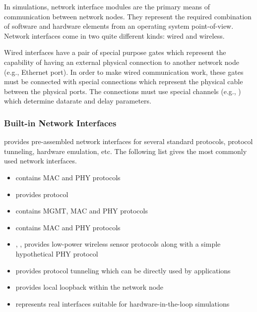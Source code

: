 

In \inet simulations, network interface modules are the primary means of communication between network nodes. They represent the required combination of software and hardware elements from an operating system point-of-view. Network interfaces come in two quite different kinds: wired and wireless.

Wired interfaces have a pair of special purpose \omnet gates which represent the capability of having an external physical connection to another network node (e.g., Ethernet port). In order to make wired communication work, these gates must be connected with special connections which represent the physical cable between the physical ports. The connections must use special \omnet channels (e.g., ) which determine datarate and delay parameters.

\subsubsection*{Built-in Network Interfaces}

\inet provides pre-assembled network interfaces for several standard protocols, protocol tunneling, hardware emulation, etc. The following list gives the most commonly used network interfaces.

\begin{itemize}
        \item {} contains  MAC and PHY protocols
        \item {} provides  protocol
        \item {} contains  MGMT, MAC and PHY protocols
        \item {} contains  MAC and PHY protocols
        \item {}, ,  provides low-power wireless sensor protocols along with a simple hypothetical PHY protocol
        \item {} provides protocol tunneling which can be directly used by applications
        \item {} provides local loopback within the network node
        \item {} represents real interfaces suitable for hardware-in-the-loop simulations
\end{itemize}


